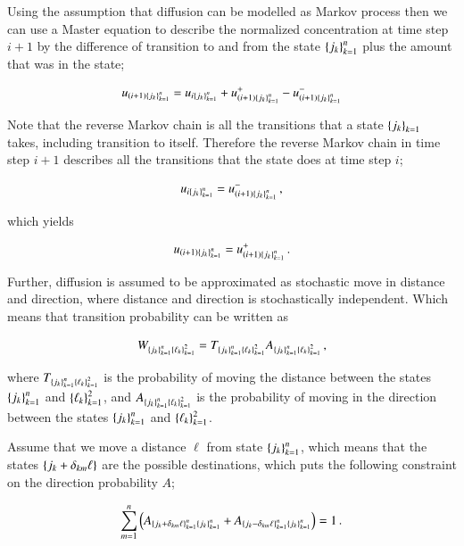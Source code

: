 \documentclass[11pt,english,a4paper]{article}
\begin{document}
\begin{flushleft}
Using the assumption that diffusion can be modelled as Markov process then we can use a Master equation to describe the normalized concentration at time step $i+1$ by the difference of transition to and from the state $\left\lbrace{j_k}\right\rbrace_{k=1}^n$ plus the amount that was in the state; 

\begin{align}
u_{(i+1)\left\lbrace{j_k}\right\rbrace_{k=1}^n} = u_{i\left\lbrace{j_k}\right\rbrace_{k=1}^n} +  u_{(i+1)\left\lbrace{j_k}\right\rbrace_{k=1}^n}^+ - u_{(i+1)\left\lbrace{j_k}\right\rbrace_{k=1}^n}^-
\label{eq_40}
\end{align} 

Note that the reverse Markov chain is all the transitions that a state $\left\lbrace{j_k}\right\rbrace_{k=1}$ takes, including transition to itself. Therefore the reverse Markov chain in time step $i+1$ describes all the transitions that the state does at time step $i$;

\begin{align*}
u_{i\left\lbrace{j_k}\right\rbrace_{k=1}^n} =  u_{(i+1)\left\lbrace{j_k}\right\rbrace_{k=1}^n}^- \,,
\end{align*}


which yields

\begin{align}
u_{(i+1)\left\lbrace{j_k}\right\rbrace_{k=1}^n} = u_{(i+1)\left\lbrace{j_k}\right\rbrace_{k=1}^n}^+ \,.
\label{eq_41}
\end{align}

Further, diffusion is assumed to be approximated as stochastic move in distance and direction, where distance and direction is stochastically independent. Which means that transition probability can be written as

\begin{align}
W_{\left\lbrace{j_k}\right\rbrace_{k=1}^n\left\lbrace{\ell_k}\right\rbrace_{k=1}^2} = T_{\left\lbrace{j_k}\right\rbrace_{k=1}^n\left\lbrace{\ell_k}\right\rbrace_{k=1}^2} A_{\left\lbrace{j_k}\right\rbrace_{k=1}^n\left\lbrace{\ell_k}\right\rbrace_{k=1}^2} \,,
\label{eq_42}
\end{align}

where $T_{\left\lbrace{j_k}\right\rbrace_{k=1}^n\left\lbrace{\ell_k}\right\rbrace_{k=1}^2}$ is the probability of moving the distance between the states $\left\lbrace{j_k}\right\rbrace_{k=1}^n$ and $\left\lbrace{\ell_k}\right\rbrace_{k=1}^2$, and $ A_{\left\lbrace{j_k}\right\rbrace_{k=1}^n\left\lbrace{\ell_k}\right\rbrace_{k=1}^2}$ is the probability of moving in the direction between the states $\left\lbrace{j_k}\right\rbrace_{k=1}^n$ and $\left\lbrace{\ell_k}\right\rbrace_{k=1}^2$. \linebreak

Assume that we move a distance $\ell$ from state $\left\lbrace{j_k}\right\rbrace_{k=1}^n$, which means that the states $\left\lbrace{j_k+\delta_{km}\ell}\right\rbrace$ are the possible destinations, which puts the following constraint on the direction probability $A$;

\begin{align}
\sum_{m=1}^n \left({A_{\left\lbrace{j_k+\delta_{km}\ell}\right\rbrace_{k=1}^n\left\lbrace{j_k}\right\rbrace_{k=1}^n}+A_{\left\lbrace{j_k-\delta_{km}\ell}\right\rbrace_{k=1}^n\left\lbrace{j_k}\right\rbrace_{k=1}^n}}\right) = 1 \,.
\label{eq_43}
\end{align}


\end{flushleft}
\end{document}
